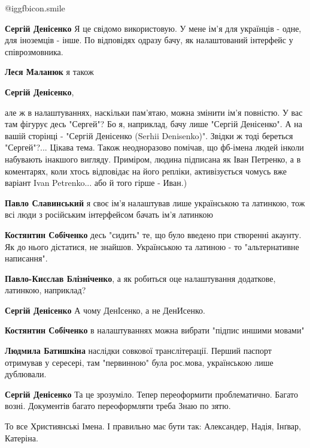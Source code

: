 \begin{itemize}
\begin{itemize}
 @igg{fbicon.smile} 

\textbf{Сергій Денісенко} Я це свідомо використовую. У мене ім'я для українців - одне, для іноземців - інше. По відповідях одразу бачу, як налаштований інтерфейс у співрозмовника.

\textbf{Леся Маланюк} я також

\textbf{Сергій Денісенко}, 

але ж в налаштуваннях, наскільки пам'ятаю, можна змінити ім'я повністю. У вас
там фігурує десь "Сергей"? Бо я, наприклад, бачу лише "Сергій Денісенко". А на
вашій сторінці - "Сергій Денісенко (Serhii Denisenko)". Звідки ж тоді береться
"Сергей"?... Цікава тема. Також неодноразово помічав, що фб-імена людей інколи
набувають інакшого вигляду. Приміром, людина підписана як Іван Петренко, а в
коментарях, коли хтось відповідає на його репліки, активізується чомусь вже
варіант Ivan Petrenko... або й того гірше - Иван.)


\textbf{Павло Славинський} я своє ім'я налаштував лише українською та латинкою, тож всі люди з російським інтерфейсом бачать ім'я латинкою

\textbf{Костянтин Собіченко} десь "сидить" те, що було введено при створенні акаунту. Як до нього дістатися, не знайшов. Українською та латиною - то "альтернативне написання".

\textbf{Павло-Києслав Блізніченко}, а як робиться оце налаштування додаткове, латинкою, наприклад?

\textbf{Сергій Денісенко} А чому ДенІсенко, а не ДенИсенко.

\textbf{Костянтин Собіченко} в налаштуваннях можна вибрати "підпис иншими мовами"

\textbf{Людмила Батишкіна} наслідки совкової транслітерації. Перший паспорт отримував у сересері, там "первинною" була рос.мова, українською лише дублювали.

\textbf{Сергій Денісенко} Та це зрозуміло. Тепер переоформити проблематично. Багато возні. Документів багато переоформляти треба
Знаю по зятю.

\end{itemize} %

То все Християнські Імена. І правильно має бути так: Александер, Надія, Інґвар, Катеріна.


\end{itemize}
